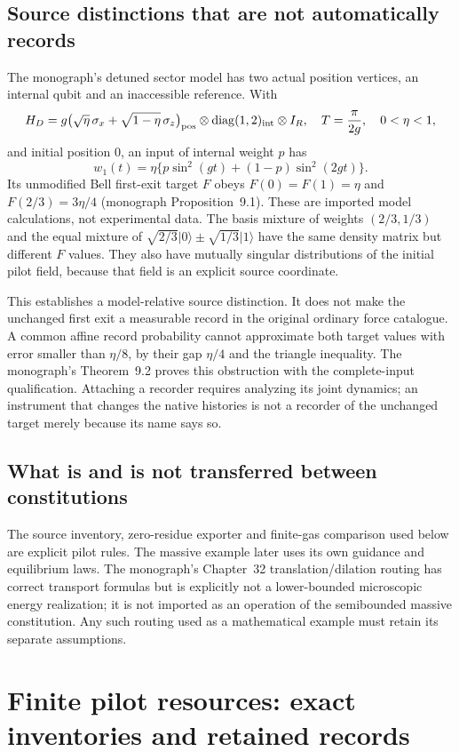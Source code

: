 \documentclass[11pt,a4paper]{article}
\theoremstyle{definition}
\theoremstyle{remark}\newtheorem{remark}[theorem]{Remark}
\newcommand{\ket}[1]{\lvert#1\rangle}
\begin{document}
\subsection{Source distinctions that are not automatically records}
The monograph's detuned sector model has two actual position vertices, an internal qubit and an inaccessible reference. With
\[
 H_D=g\bigl(\sqrt\eta\,\sigma_x+\sqrt{1-\eta}\,\sigma_z\bigr)_{\rm pos}
 \otimes\operatorname{diag}(1,2)_{\rm int}\otimes I_R,
 \quad T=\frac\pi{2g},\quad0<\eta<1,
\]
and initial position $0$, an input of internal weight $p$ has
\[
 w_1(t)=\eta\{p\sin^2(gt)+(1-p)\sin^2(2gt)\}.
\]
Its unmodified Bell first-exit target $F$ obeys $F(0)=F(1)=\eta$ and $F(2/3)=3\eta/4$ (monograph Proposition~9.1). These are imported model calculations, not experimental data. The basis mixture of weights $(2/3,1/3)$ and the equal mixture of $\sqrt{2/3}\ket0\pm\sqrt{1/3}\ket1$ have the same density matrix but different $F$ values. They also have mutually singular distributions of the initial pilot field, because that field is an explicit source coordinate.

This establishes a model-relative source distinction. It does not make the unchanged first exit a measurable record in the original ordinary force catalogue. A common affine record probability cannot approximate both target values with error smaller than $\eta/8$, by their gap $\eta/4$ and the triangle inequality. The monograph's Theorem~9.2 proves this obstruction with the complete-input qualification. Attaching a recorder requires analyzing its joint dynamics; an instrument that changes the native histories is not a recorder of the unchanged target merely because its name says so.

\subsection{What is and is not transferred between constitutions}
The source inventory, zero-residue exporter and finite-gas comparison used below are explicit pilot rules. The massive example later uses its own guidance and equilibrium laws. The monograph's Chapter~32 translation/dilation routing has correct transport formulas but is explicitly not a lower-bounded microscopic energy realization; it is not imported as an operation of the semibounded massive constitution. Any such routing used as a mathematical example must retain its separate assumptions.

\section{Finite pilot resources: exact inventories and retained records}
\label{pil:section}
\end{document}
